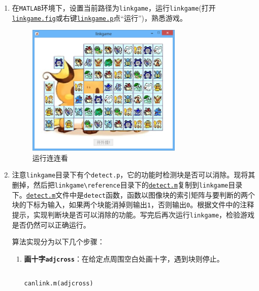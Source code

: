 \documentclass{article}
\numberwithin{figure}{section}
\numberwithin{table}{section}
\numberwithin{listing}{section}
\numberwithin{equation}{section}
\begin{document}
        \begin{enumerate}
            \item 在\texttt{MATLAB}环境下，设置当前路径为\texttt{linkgame}，运行\texttt{linkgame}(打开\href{../linkgame/linkgame.fig}{\texttt{linkgame.fig}}或右键\href{../linkgame/linkgame.p}{\texttt{linkgame.p}}点“运行”)，熟悉游戏。

                \begin{figure}[H]
                    \centering
                    \includegraphics[width=0.7\textwidth]{run_linkgame}
                    \caption{运行连连看}
                \end{figure}

            \item 注意\texttt{linkgame}目录下有个\texttt{detect.p}，它的功能时检测块是否可以消除。现将其删掉，然后把\texttt{linkgame\textbackslash reference}目录下的\href{../linkgame/reference/detect.m}{\texttt{detect.m}}复制到\texttt{linkgame}目录下。\href{../linkgame/detect.m}{\texttt{detect.m}}文件中是\texttt{detect}函数，函数以图像块的索引矩阵与要判断的两个块的下标为输入，如果两个块能消掉则输出\texttt{1}，否则输出\texttt{0}。根据文件中的注释提示，实现判断块是否可以消除的功能。写完后再次运行\texttt{linkgame}，检验游戏是否仍然可以正确运行。

                算法实现分为以下几个步骤：

                \begin{enumerate}
                    \item \textbf{画十字\texttt{adjcross}}：在给定点周围空白处画十字，遇到块则停止。

                        \begin{listing}[H]
                            \inputminted[firstline=29, lastline=48]{matlab}{../linkgame/canlink.m}
                            \caption{\texttt{canlink.m(adjcross)}}
                        \end{listing}


\end{enumerate}
\end{enumerate}
\end{document}
